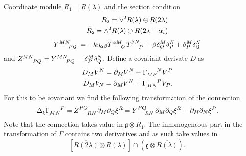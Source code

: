 \documentclass{article}
\begin{document}
Coordinate module $R_1=R(\lambda)$ and the section condition 
\begin{align}
    R_2 = \vee^2 R(\lambda)\ominus R(2\lambda)\\
    \Tilde{R}_2 = \wedge^2 R(\lambda)\ominus R(2\lambda-\alpha_i)
\end{align}
\begin{equation}
    \tensor{Y}{^M^N_P_Q} = -k\eta_{\alpha\beta}\tensor{T}{^\alpha^M_Q}\tensor{T}{^\beta^N_P}+\beta\delta^M_Q\delta^N_P+\delta^M_P\delta^N_Q
\end{equation}
and $\tensor{Z}{^M^N_P_Q}=\tensor{Y}{^M^N_P_Q}-\delta^M_P\delta^N_Q$. Define a covariant derivate $D$ as
\begin{align}
    D_M V^N = \pd_MV^N-\tensor{\Gamma}{_M_P^N}V^P\\
    D_M V_N = \pd_MV^N+\tensor{\Gamma}{_M_N^P}V_P.
\end{align}
For this to be covariant we find the following transformation of the connection 
\begin{equation}
    \Delta_\xi\tensor{\Gamma}{_M_N^P} = \tensor{Z}{^P^Q_R_N}\pd_M\pd_Q\xi^R = \tensor{Y}{^P^Q_R_N}\pd_M\pd_Q\xi^R-\pd_M\pd_N\xi^P. 
\end{equation}
Note that the connection takes value in $\mathfrak{g}\otimes \overbar{R}_1$. The inhomogeneous part in the transformation of $\Gamma$ contains two derivatives and as such take values in
\begin{equation}
    \left[\overbar{R(2\lambda)}\otimes R(\lambda)\right]\cap \left(\mathfrak{g}\otimes\overbar{R(\lambda)}\right).
\end{equation}
\end{document}
